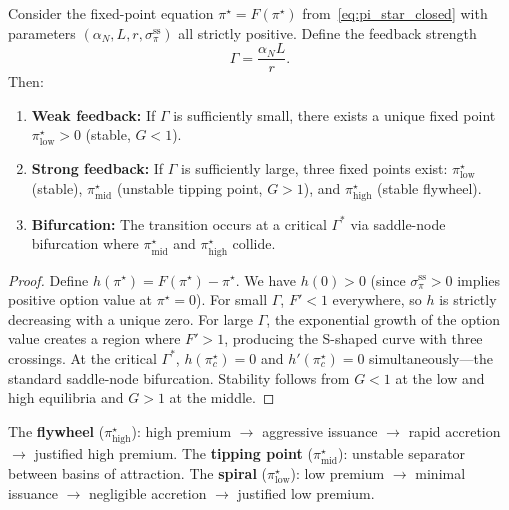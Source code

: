 \begin{theorem}
  \label{thm:three_equilibria}
  Consider the fixed-point equation $\pi^\star = F(\pi^\star)$
  from~\eqref{eq:pi_star_closed} with parameters
  $(\alpha_N, L, r, \sigma_\pi^{\mathrm{ss}})$ all strictly positive.
  Define the feedback strength
  \begin{equation}
    \label{eq:feedback_strength}
    \Gamma = \frac{\alpha_N L}{r}.
  \end{equation}
  Then:
  \begin{enumerate}
    \item \textbf{Weak feedback:} If $\Gamma$ is sufficiently small, there
      exists a unique fixed point $\pi^\star_{\mathrm{low}} > 0$ (stable,
      $G < 1$).
    \item \textbf{Strong feedback:} If $\Gamma$ is sufficiently large,
      three fixed points exist:
      $\pi^\star_{\mathrm{low}}$ (stable),
      $\pi^\star_{\mathrm{mid}}$ (unstable tipping point, $G > 1$), and
      $\pi^\star_{\mathrm{high}}$ (stable flywheel).
    \item \textbf{Bifurcation:} The transition occurs at a critical
      $\Gamma^*$ via saddle-node bifurcation where
      $\pi^\star_{\mathrm{mid}}$ and $\pi^\star_{\mathrm{high}}$ collide.
  \end{enumerate}
\end{theorem}

\begin{proof}
  Define $h(\pi^\star) = F(\pi^\star) - \pi^\star$.  We have $h(0) > 0$
  (since $\sigma_\pi^{\mathrm{ss}} > 0$ implies positive option value at
  $\pi^\star = 0$).  For small $\Gamma$, $F' < 1$ everywhere, so $h$ is
  strictly decreasing with a unique zero.  For large $\Gamma$, the
  exponential growth of the option value creates a region where $F' > 1$,
  producing the S-shaped curve with three crossings.  At the critical
  $\Gamma^*$, $h(\pi^\star_c) = 0$ and $h'(\pi^\star_c) = 0$
  simultaneously---the standard saddle-node bifurcation.  Stability follows
  from $G < 1$ at the low and high equilibria and $G > 1$ at the middle.
\end{proof}

\begin{remark}
  \label{rem:three_equil_econ}
  The \textbf{flywheel} ($\pi^\star_{\mathrm{high}}$): high premium $\to$
  aggressive issuance $\to$ rapid accretion $\to$ justified high premium.
  The \textbf{tipping point} ($\pi^\star_{\mathrm{mid}}$): unstable
  separator between basins of attraction.
  The \textbf{spiral} ($\pi^\star_{\mathrm{low}}$): low premium $\to$
  minimal issuance $\to$ negligible accretion $\to$ justified low premium.
\end{remark}

